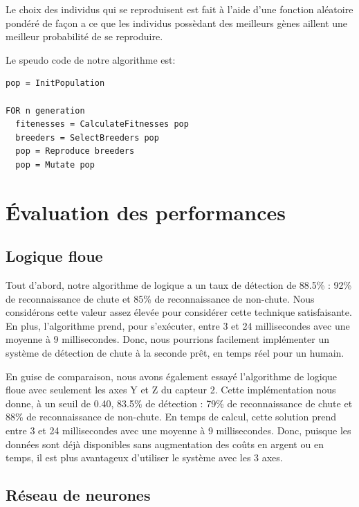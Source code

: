 \documentclass[12pt,letterpaper]{article}
\begin{document}
Le choix des individus qui se reproduisent est fait à l'aide d'une fonction aléatoire pondéré de façon a ce que les individus possèdant
des meilleurs gènes aillent une meilleur probabilité de se reproduire.

Le speudo code de notre algorithme est:

\begin{verbatim}
pop = InitPopulation

FOR n generation
  fitenesses = CalculateFitnesses pop
  breeders = SelectBreeders pop
  pop = Reproduce breeders
  pop = Mutate pop

\end{verbatim}


\section{Évaluation des performances}

\subsection{Logique floue}

Tout d'abord, notre algorithme de logique a un taux de détection de 88.5\% : 92\% de reconnaissance de chute et 85\% de reconnaissance de non-chute. Nous considérons cette valeur assez élevée pour considérer cette technique satisfaisante. En plus, l'algorithme prend, pour s'exécuter, entre 3 et 24 millisecondes avec une moyenne à 9 millisecondes. Donc, nous pourrions facilement implémenter un système de détection de chute à la seconde prêt, en temps réel pour un humain.

En guise de comparaison, nous avons également essayé l'algorithme de logique floue avec seulement les axes Y et Z du capteur 2. Cette implémentation nous donne, à un seuil de 0.40, 83.5\% de détection : 79\% de reconnaissance de chute et 88\% de reconnaissance de non-chute. En temps de calcul, cette solution prend entre 3 et 24 millisecondes avec une moyenne à 9 millisecondes. Donc, puisque les données sont déjà disponibles sans augmentation des coûts en argent ou en temps, il est plus avantageux d'utiliser le système avec les 3 axes.

\subsection{Réseau de neurones} %
\end{document}
